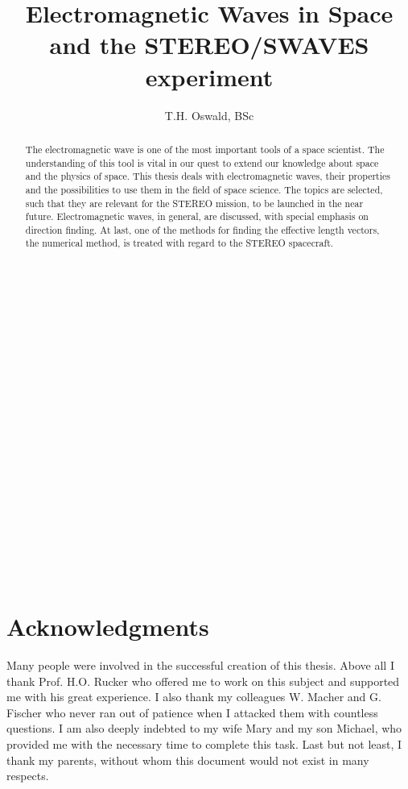 \documentclass[a4paper,10pt]{thesis}
\title{Electromagnetic Waves in Space and the STEREO/SWAVES experiment}
\author{T.H. Oswald, BSc}
\begin{document}
\maketitle

\newpage
\paragraph*{}
 \begin{verbatim}



















\end{verbatim}
\begin{center}
\end{center}
\frontmatter
\chapter{\textbf{Acknowledgments}}
Many people were involved in the successful creation of this thesis. Above all I thank Prof. H.O. Rucker who offered me to work on this subject and supported me with his great experience. I also thank my colleagues W. Macher and G. Fischer who never ran out of patience when I attacked them with countless questions. I am also deeply indebted to my wife Mary and my son Michael, who provided me with the necessary time to complete this task. Last but not least, I thank my parents, without whom this document would not exist in many respects.

\tableofcontents
\begin{abstract}
\paragraph*{}
The electromagnetic wave is one of the most important tools of a space scientist. The understanding of this tool is vital in our quest to extend our knowledge about space and the physics of space. This thesis deals with electromagnetic waves, their properties and the possibilities to use them in the field of space science. The topics are selected, such that they are relevant for the STEREO mission, to be launched in the near future. Electromagnetic waves, in general, are discussed, with special emphasis on direction finding. At last, one of the methods for finding the effective length vectors, the numerical method, is treated with regard to the STEREO spacecraft.\\

\end{abstract}
\mainmatter
\end{document}
